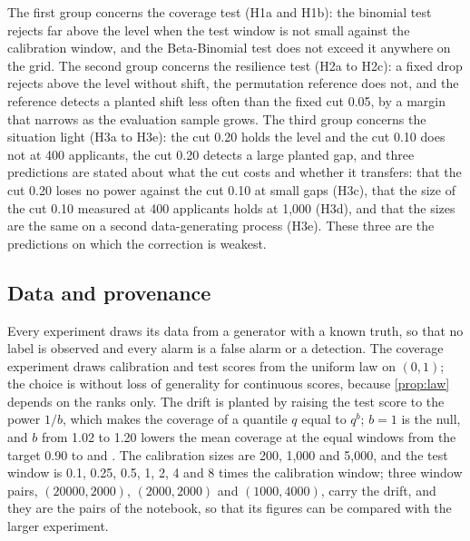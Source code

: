 

The first group concerns the coverage test (H1a and H1b): the binomial test rejects far above the level when the test window is not small against the calibration window, and the Beta-Binomial test does not exceed it anywhere on the grid. The second group concerns the resilience test (H2a to H2c): a fixed drop rejects above the level without shift, the permutation reference does not, and the reference detects a planted shift less often than the fixed cut 0.05, by a margin that narrows as the evaluation sample grows. The third group concerns the situation light (H3a to H3e): the cut 0.20 holds the level and the cut 0.10 does not at 400 applicants, the cut 0.20 detects a large planted gap, and three predictions are stated about what the cut costs and whether it transfers: that the cut 0.20 loses no power against the cut 0.10 at small gaps (H3c), that the size of the cut 0.10 measured at 400 applicants holds at 1,000 (H3d), and that the sizes are the same on a second data-generating process (H3e). These three are the predictions on which the correction is weakest.

\subsection{Data and provenance}

Every experiment draws its data from a generator with a known truth, so that no label is observed and every alarm is a false alarm or a detection. The coverage experiment draws calibration and test scores from the uniform law on $(0,1)$; the choice is without loss of generality for continuous scores, because \cref{prop:law} depends on the ranks only. The drift is planted by raising the test score to the power $1/b$, which makes the coverage of a quantile $q$ equal to $q^b$; $b=1$ is the null, and $b$ from 1.02 to 1.20 lowers the mean coverage at the equal windows from the target 0.90 to \CovMeanBTwo{} and \CovMeanBTwenty{}. The calibration sizes are 200, 1,000 and 5,000, and the test window is 0.1, 0.25, 0.5, 1, 2, 4 and 8 times the calibration window; three window pairs, $(20000,2000)$, $(2000,2000)$ and $(1000,4000)$, carry the drift, and they are the pairs of the notebook, so that its figures can be compared with the larger experiment.

